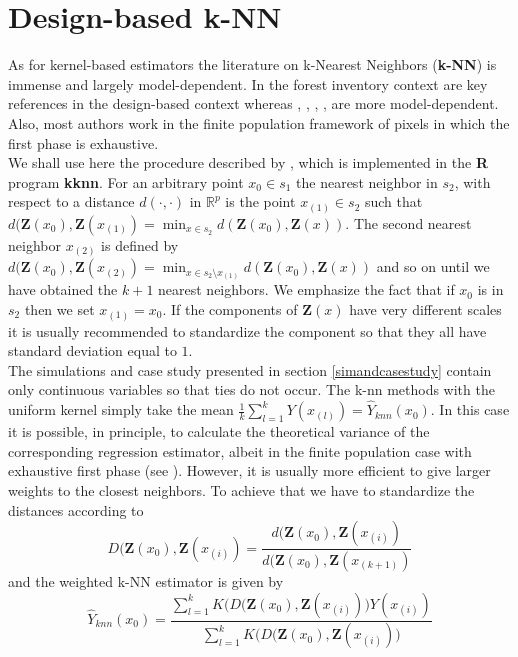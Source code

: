 \documentclass[a4paper,12pt,leqno, titlepage]{article}
\newcommand{\R}{\mathbb{R}}
\begin{document}
 \section{Design-based k-NN}\label{knn}
As for kernel-based estimators the literature on k-Nearest Neighbors (\textbf{k-NN}) is immense and largely model-dependent. In the forest inventory context \cite{bafetta1,bafetta2} are key references in the design-based context whereas \cite{McRoberts1}, \cite{McRoberts2}, \cite{magnussen1}, \cite{MacRoberts3}, \cite{breidenbach1} are more model-dependent. Also, most authors work in the finite population framework of pixels in which the first phase is exhaustive.\\
We shall use here the procedure described by \cite{hechenbichler1}, which is implemented in the \textbf{R} program \textbf{kknn}. For an arbitrary point $x_0\in{s_1}$ the nearest neighbor in $s_2$, with respect to a distance $d(\cdot,\cdot)$ in $\R^p$ is the point $x_{(1)}\in{s_2}$ such that $d(\pmb{Z}(x_0),\pmb{Z}(x_{(1)})=\min_{x\in{s_2}}d(\pmb{Z}(x_0),\pmb{Z}(x))$. The second nearest neighbor $x_{(2)}$ is defined by
$d(\pmb{Z}(x_0),\pmb{Z}(x_{(2)})=\min_{ x\in{s_2}\setminus{x_{(1)}}}d(\pmb{Z}(x_0),\pmb{Z}(x))$
and so on until we have obtained the $k+1$ nearest neighbors. We emphasize the fact that if $x_0$ is in $s_2$ then we set $x_{(1)}=x_0$. If the components of $\pmb{Z}(x)$ have very different scales it is usually recommended to standardize the component so that they all have standard deviation equal to $1$.\\
The simulations and case study presented in section \ref{simandcasestudy} contain only continuous variables so that ties do not occur. The k-nn methods with the uniform kernel simply take the mean $\frac{1}{k}\sum_{l=1}^k Y(x_{(l)})=\hat{Y}_{knn}(x_0)$. In this case it is possible, in principle, to calculate the theoretical variance of the corresponding regression estimator, albeit in the finite population case with exhaustive first phase (see \cite{bafetta1}). However, it is usually more efficient to give larger weights to the closest neighbors. To achieve that we have to standardize
the distances according to
\begin{equation}\label{knnstandarddist}
D(\pmb{Z}(x_0),\pmb{Z}(x_{(i)})=\frac{d(\pmb{Z}(x_0),\pmb{Z}(x_{(i)})}{d(\pmb{Z}(x_0),\pmb{Z}(x_{(k+1)})}
\end{equation}
and the weighted k-NN estimator is given by
\begin{equation}\label{kernelknn}
\hat{Y}_{knn}(x_0)=\frac{\sum_{l=1}^k K\big(D(\pmb{Z}(x_0),\pmb{Z}(x_{(i)})\big)Y(x_{(i)})}
{\sum_{l=1}^k K\big(D(\pmb{Z}(x_0),\pmb{Z}(x_{(i)})\big)}
\end{equation}
\end{document}
